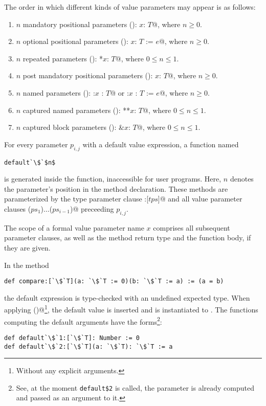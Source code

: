 The order in which different kinds of value parameters may appear is as follows:
\begin{enumerate}
\item $n$ mandatory positional parameters (): \lstinline@$x$: $T$@, where $n \ge 0$.

\item $n$ optional positional parameters (): \lstinline@$x$: $T$ := $e$@, where $n \ge 0$. 

\item $n$ repeated parameters (): \lstinline@*$x$: $T$@, where $0 \le n \le 1$. 

\item $n$ post mandatory positional parameters (): \lstinline@$x$: $T$@, where $n \ge 0$.

\item $n$ named parameters (): \lstinline@:$x$ : $T$@ or \lstinline@:$x$ : $T$ := $e$@, where $n \ge 0$. 

\item $n$ captured named parameters (): \lstinline@**$x$: $T$@, where $0 \le n \le 1$. 

\item $n$ captured block parameters (): \lstinline@&$x$: $T$@, where $0 \le n \le 1$.
\end{enumerate}

For every parameter $p_{i,j}$ with a default value expression, a function named 
\begin{lstlisting}[escapechar=`]
default`\$`$n$
\end{lstlisting}
is generated inside the function, inaccessible for user programs. Here, $n$ denotes the parameter's position in the method declaration. These methods are parameterized by the type parameter clause \lstinline@:[$tps$]@ and all value parameter clauses \lstinline@($ps_1$)$\ldots$($ps_{i-1}$)@ preceeding $p_{i,j}$.

The scope of a formal value parameter name $x$ comprises all subsequent parameter clauses, as well as the method return type and the function body, if they are given.

\example In the method
\begin{lstlisting}[escapechar=`]
def compare:[`\$`T](a: `\$`T := 0)(b: `\$`T := a) := (a = b)
\end{lstlisting}
the default expression  is type-checked with an undefined expected type. When applying \lstinline@compare()@\footnote{Without any explicit arguments.}, the default value  is inserted and  is instantiated to . The functions computing the default arguments have the forms\footnote{See, at the moment \lstinline[mathescape=false]!default$2! is called, the parameter  is already computed and passed as an argument to it.}:
\begin{lstlisting}[escapechar=`]
def default`\$`1:[`\$`T]: Number := 0
def default`\$`2:[`\$`T](a: `\$`T): `\$`T := a
\end{lstlisting}

